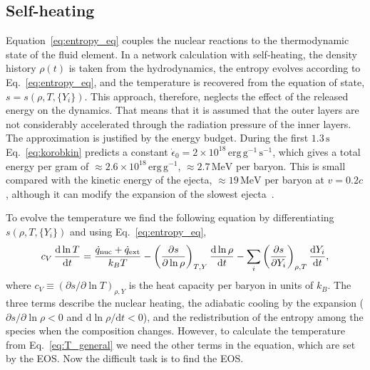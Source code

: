 \subsection{Self-heating}\label{sec:self_heating}

Equation~\ref{eq:entropy_eq} couples the nuclear reactions to the thermodynamic state of the fluid element.
In a network calculation with self-heating, the density history $\rho(t)$ is taken from the hydrodynamics, the entropy evolves according to Eq.~\ref{eq:entropy_eq}, and the temperature is recovered from the equation of state, $s=s(\rho,T,\{Y_i\})$.
This approach, therefore, neglects the effect of the released energy on the dynamics.
That means that it is assumed that the outer layers are not considerably accelerated through the radiation pressure of the inner layers.
The approximation is justified by the energy budget.
During the first $1.3\,\mathrm{s}$ Eq.~\ref{eq:korobkin} predicts a constant $\dot \epsilon_0=2\times 10^{18}\,\mathrm{erg\,g^{-1}\,s^{-1}}$, which gives a total energy per gram of $\approx2.6\times10^{18}\,\mathrm{erg\,g^{-1}}$, $\approx2.7\,\mathrm{MeV}$ per baryon.
This is small compared with the kinetic energy of the ejecta, $\approx19\,\mathrm{MeV}$ per baryon at $v=0.2c$, although it can modify the expansion of the slowest ejecta~\cite{rosswog_long-term_2014}.

To evolve the temperature we find the following equation by differentiating $s(\rho,T,\{Y_i\})$ and using Eq.~\ref{eq:entropy_eq},
\begin{equation}\label{eq:T_general}
  c_V\,\frac{\mathrm{d}\ln T}{\mathrm{d}t}=\frac{\dot q_{\rm nuc}+\dot q_{\rm ext}}{k_BT}-\left(\frac{\partial s}{\partial\ln\rho}\right)_{T,Y}\frac{\mathrm{d}\ln\rho}{\mathrm{d}t}-\sum_i\left(\frac{\partial s}{\partial Y_i}\right)_{\rho,T}\frac{\mathrm{d}Y_i}{\mathrm{d}t},
\end{equation}
where $c_V\equiv(\partial s/\partial\ln T)_{\rho,Y}$ is the heat capacity per baryon in units of $k_B$.
The three terms describe the nuclear heating, the adiabatic cooling by the expansion ($\partial s/\partial\ln\rho<0$ and $\mathrm{d}\ln\rho/\mathrm{d}t<0$), and the redistribution of the entropy among the species when the composition changes.
However, to calculate the temperature from Eq.~\ref{eq:T_general} we need the other terms in the equation, which are set by the EOS.
Now the difficult task is to find the EOS.

